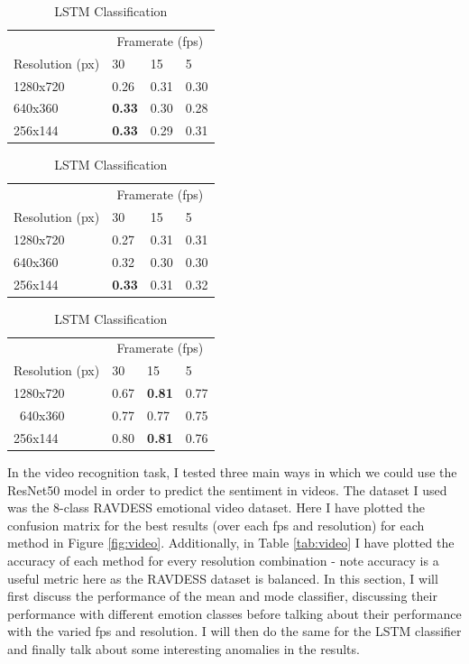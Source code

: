 \documentclass[sigconf]{acmart}
\begin{document}
{\begin{table}[h]
	\caption{Comparison of video classifiers accuracy on the RAVDESS dataset.}
	\label{tab:video}
	\begin{subtable}[b]{0.3\textwidth}
		\caption{Mean Classification}\label{tab:acc-mean}
		\begin{tabularx}{0.9\textwidth}{l X X X}
		&\multicolumn{3}{c}{Framerate (fps)} \\\cmidrule{2-4}
		Resolution (px) &30 &15 &5 \\\cmidrule{1-4}
		1280x720 &0.26 &0.31 &0.30 \\
		640x360 &\textbf{0.33} &0.30 &0.28 \\
		256x144 &\textbf{0.33} &0.29 &0.31 \\
		\end{tabularx}
	\end{subtable}
	\begin{subtable}[b]{0.3\textwidth}
		\caption{Mode Classification}\label{tab:acc-mean}
		\begin{tabularx}{0.9\textwidth}{l X X X}
		&\multicolumn{3}{c}{Framerate (fps)} \\\cmidrule{2-4}
		Resolution (px) &30 &15 &5 \\\cmidrule{1-4}
		1280x720 &0.27 &0.31 &0.31 \\
		640x360 &0.32 &0.30 &0.30 \\
		256x144 &\textbf{0.33} &0.31 &0.32 \\
		\end{tabularx}
	\end{subtable}
	\begin{subtable}[b]{0.3\textwidth}
		\caption{LSTM Classification}\label{tab:acc-lstm}
		\begin{tabularx}{0.9\textwidth}{l X X X}
		&\multicolumn{3}{c}{Framerate (fps)} \\\cmidrule{2-4}
		Resolution (px) &30 &15 &5 \\\cmidrule{1-4}
		1280x720 &0.67 &\textbf{0.81} &0.77 \\\
		640x360 &0.77 &0.77 &0.75 \\
		256x144 &0.80 &\textbf{0.81} &0.76 \\
		\end{tabularx}
	\end{subtable}
\end{table}
In the video recognition task, I tested three main ways in which we could use
the ResNet50 model in order to predict the sentiment in videos. The dataset I
used was the 8-class RAVDESS emotional video dataset. Here I have plotted the
confusion matrix for the best results (over each fps and resolution) for 
each method in Figure \ref{fig:video}. Additionally, in Table \ref{tab:video}
I have plotted the accuracy of each method for every resolution combination -
note accuracy is a useful metric here as the RAVDESS dataset is balanced. In
this section, I will first discuss the performance of the mean and mode
classifier, discussing their performance with different emotion classes before
talking about their performance with the varied fps and resolution. I will
then do the same for the LSTM classifier and finally talk about some
interesting anomalies in the results.

}
\end{document}
